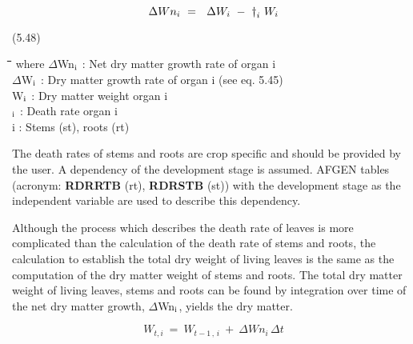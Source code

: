 \documentclass[11pt]{article}
\begin{document}
\begin{displaymath}
\Delta Wn _{i~} =~\,\,\Delta W _{i~} -~ {\rm \dag } _{i} \,\, W _{i} 
\end{displaymath}

 \bigskip
\strut\hfill (5.48)
\nwln
\begin{tabbing}
\hspace{1.27cm}\=\hspace{1.27cm}\=\hspace{1.27cm}\=\hspace{1.27cm}\=%
\hspace{1.27cm}\=\hspace{1.27cm}\=\hspace{1.27cm}\=\hspace{1.27cm}\=%
\hspace{1.27cm}\=\hspace{1.27cm}\=\kill
where\> $\Delta$Wn$_{{\rm i}}$\> : Net dry matter growth rate of organ i\> \> \> \> \> \> \> \> [kg ha$^{{\rm -1}}$ d$^{{\rm -1}}$]\\
\>$\Delta$W$_{{\rm i}}$\> : Dry matter growth rate of organ i (see eq. 5.45)\> \> \> \> \> \> \> \> [kg ha$^{{\rm -1}}$ d$^{{\rm -1}}$]\\
\>W$_{{\rm i}}$\> : Dry matter weight organ i\> \> \> \> \> \> \> \> [kg ha$^{{\rm -1}}$]\\
\>\dag $_{{\rm i}}$\> : Death rate organ i\> \> \> \> \> \> \> \> [kg kg$^{{\rm -1}}$ d$^{{\rm -1}}$]\\
\>i\> : Stems (st), roots (rt)
\end{tabbing}

 \bigskip
The death rates of stems and roots are crop specific and should be provided by the user.
A dependency of the development stage is assumed. AFGEN tables (acronym: {\bf RDR\-RTB}
(rt), {\bf RDRSTB} (st)) with the development stage as the independent variable are used to
describe this dependency.

\bigskip
\bigskip
Although the process which describes the death rate of leaves is more complicated than
the calculation of the death rate of stems and roots, the calculation to establish the total
dry weight of living leaves is the same as the computation of the dry matter weight of
stems and roots. The total dry matter weight of living leaves, stems and roots can be
found by integration over time of the net dry matter growth, $\Delta$Wn$_{{\rm i}}$, yields the dry matter.

\begin{displaymath}
W _{t,i} ~=~W _{t-1\, ,\, i} ~+~\Delta Wn _{i} \,\Delta t
\end{displaymath}
\end{document}
